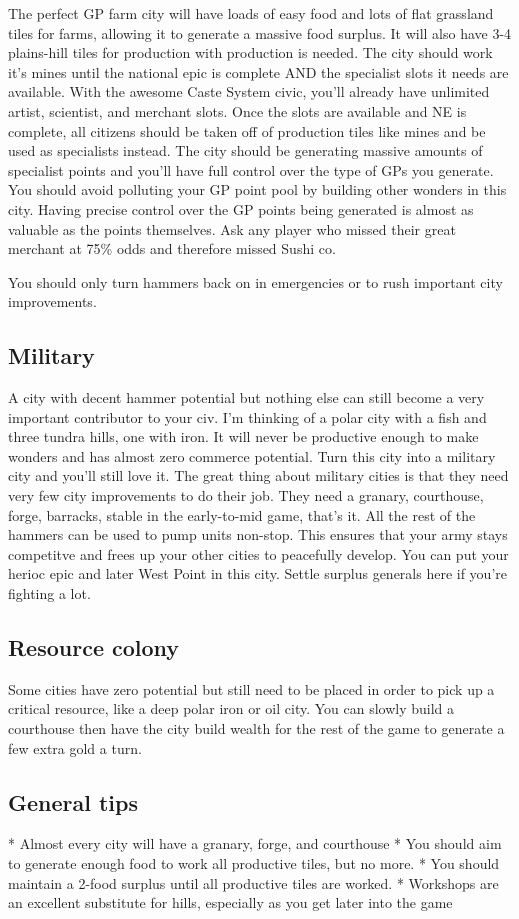 \documentclass[10pt]{article}
\begin{document}
The perfect GP farm city will have loads of easy food and lots of flat grassland tiles for
farms, allowing it to generate a massive food surplus. It will also have 3-4 plains-hill tiles
for production with production is needed. The city should work it's mines until the national
epic is complete AND the specialist slots it needs are available. With the awesome Caste System
civic, you'll already have unlimited artist, scientist, and merchant slots. Once the slots are
available and NE is complete, all citizens should be taken off of production tiles like mines
and be used as specialists instead. The city should be generating massive amounts of specialist
points and you'll have full control over the type of GPs you generate. You should avoid polluting
your GP point pool by building other wonders in this city. Having precise control over the GP
points being generated is almost as valuable as the points themselves. Ask any player who missed
their great merchant at 75\% odds and therefore missed Sushi co.

You should only turn hammers back on in emergencies or to rush important city improvements.

\subsection*{Military}

A city with decent hammer potential but nothing else can still become a very important
contributor to your civ. I'm thinking of a polar city with a fish and three tundra hills, one with
iron. It will never be productive enough to make wonders and has almost zero commerce potential.
Turn this city into a military city and you'll still love it. The great thing about military cities is
that they need very few city improvements to do their job. They need a granary, courthouse, forge, barracks,
stable in the early-to-mid game, that's it. All the rest of the hammers can be used to pump units non-stop.
This ensures that your army stays competitve and frees up your other cities to peacefully develop. You can
put your herioc epic and later West Point in this city. Settle surplus generals here if you're fighting a lot.

\subsection*{Resource colony}

Some cities have zero potential but still need to be placed in order to pick up a critical resource, like
a deep polar iron or oil city. You can slowly build a courthouse then have the city build wealth for the
rest of the game to generate a few extra gold a turn.

\subsection*{General tips}

* Almost every city will have a granary, forge, and courthouse
* You should aim to generate enough food to work all productive tiles, but no more.
* You should maintain a 2-food surplus until all productive tiles are worked.
* Workshops are an excellent substitute for hills, especially as you get later into the game
\end{document}
